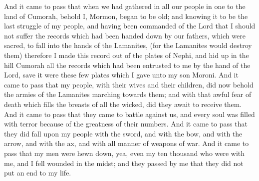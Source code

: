 And it came to pass that when we had gathered in all our people in one to the land of Cumorah, behold I, Mormon, began to be old; and knowing it to be the last struggle of my people, and having been commanded of the Lord that I should not suffer the records which had been handed down by our fathers, which were sacred, to fall into the hands of the Lamanites, (for the Lamanites would destroy them) therefore I made this record out of the plates of Nephi, and hid up in the hill Cumorah all the records which had been entrusted to me by the hand of the Lord, save it were these few plates which I gave unto my son Moroni.
\bverse \iffalse And it came to pass that my people, with their wives and their children, did now behold the armies of the Lamanites marching towards them; and with that awful fear of death which fills the breasts of all the wicked, did they await to receive them. \fi
And it came to pass that my people, with their wives and their children, did now behold the armies of the Lamanites marching towards them; and with that awful fear of death which fills the breasts of all the wicked, did they await to receive them.
\bverse \iffalse And it came to pass that they came to battle against us, and every soul was filled with terror because of the greatness of their numbers. \fi
And it came to pass that they came to battle against us, and every soul was filled with terror because of the greatness of their numbers.
\bverse \iffalse And it came to pass that they did fall upon my people with the sword, and with the bow, and with the arrow, and with the ax, and with all manner of weapons of war. \fi
And it came to pass that they did fall upon my people with the sword, and with the bow, and with the arrow, and with the ax, and with all manner of weapons of war.
\bverse \iffalse And it came to pass that my men were hewn down, yea, even my ten thousand who were with me, and I fell wounded in the midst; and they passed by me that they did not put an end to my life. \fi
And it came to pass that my men were hewn down, yea, even my ten thousand who were with me, and I fell wounded in the midst; and they passed by me that they did not put an end to my life.
\bverse \iffalse And when they had gone through and hewn down all my people save it were twenty and four of us, (among whom was my son Moroni) and we having survived the dead of our people, did behold on the morrow, when the Lamanites had returned unto their camps, from the top of the hill Cumorah, the ten thousand of my people who were hewn down, being led in the front by me. \fi
